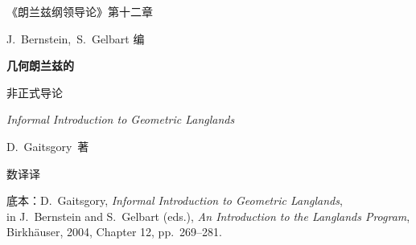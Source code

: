 \thispagestyle{empty}
\begin{center}
\vspace*{2.2cm}

{\Large 《朗兰兹纲领导论》\quad 第十二章}

\vspace{0.5cm}

{\normalsize J.~Bernstein,\ S.~Gelbart 编}

\vspace{1.6cm}

{\Huge\bfseries 几何朗兰兹的\par\vspace{0.35em}非正式导论}

\vspace{0.7cm}

{\large\itshape Informal Introduction to Geometric Langlands}

\vspace{1.4cm}

{\Large D.~Gaitsgory\ 著}

\vspace{2.0cm}

{\large 数译\hspace{0.6em}译}

\vfill

{\small 底本：D.~Gaitsgory, \emph{Informal Introduction to Geometric Langlands},\\
in J.~Bernstein and S.~Gelbart (eds.), \emph{An Introduction to the Langlands Program},\\
Birkhäuser, 2004, Chapter 12, pp.~269--281.}

\vspace{0.6cm}
\end{center}
\clearpage
